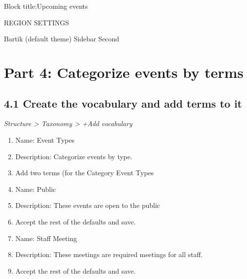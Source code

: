 \documentclass[letterpaper,10pt,english]{sphinxmanual}
\begin{document}
Block title:Upcoming events

REGION SETTINGS

Bartik (default theme)
Sidebar Second


\chapter{Part 4: Categorize events by terms}
\label{event_calendar:part-4-categorize-events-by-terms}

\section{4.1 Create the vocabulary and add terms to it}
\label{event_calendar:create-the-vocabulary-and-add-terms-to-it}
\emph{Structure \textgreater{} Taxonomy \textgreater{} +Add vocabulary}
\begin{enumerate}
\item {} 
Name: Event Types

\item {} 
Description: Categorize events by type.

\item {} 
Add two terms (for the Category Event Types

\item {} 
Name: Public

\item {} 
Description: These events are open to the public

\item {} 
Accept the rest of the defaults and save.

\item {} 
Name: Staff Meeting

\item {} 
Description: These meetings are required meetings for all staff.

\item {} 
Accept the rest of the defaults and save.

\end{enumerate}
\end{document}
